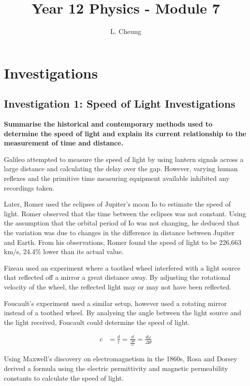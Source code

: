 \documentclass{report}
\title{\Huge Year 12 Physics - Module 7}
\author{L. Cheung}
\begin{document}
	\maketitle
	\tableofcontents
\newpage

\chapter{Investigations}

	\section{Investigation 1: Speed of Light Investigations}
	
		\textbf{Summarise the historical and contemporary methods used to determine the speed of light and explain its current relationship to the measurement of time and distance.}

			\subitem Galileo attempted to measure the speed of light by using lantern signals across a large distance and calculating the delay over the gap. However, varying human reflexes and the primitive time measuring equipment available inhibited any recordings taken.

			\subitem Later, Romer used the eclipses of Jupiter's moon Io to estimate the speed of light. Romer observed that the time between the eclipses was not constant. Using the assumption that the orbital period of Io was not changing, he deduced that the variation was due to changes in the difference in distance between Jupiter and Earth. From his observations, Romer found the speed of light to be 226,663 km/s, 24.4\% lower than its actual value.

			\subitem Fizeau used an experiment where a toothed wheel interfered with a light source that reflected off a mirror a great distance away. By adjusting the rotational velocity of the wheel, the reflected light may or may not have been reflected.

			\subitem Foucault's experiment used a similar setup, however used a rotating mirror instead of a toothed wheel. By analysing the angle between the light source and the light received, Foucault could determine the speed of light.

			\begin{align*}
				c &= \frac{d}{t} = \frac{d}{\frac{\Delta \theta}{\omega}} = \frac{d \omega}{\Delta \theta}
			\end{align*}

			\subitem Using Maxwell's discovery on electromagnetism in the 1860s, Rosa and Dorsey derived a formula using the electric permittivity and magnetic permeability constants to calculate the speed of light.
\end{document}
